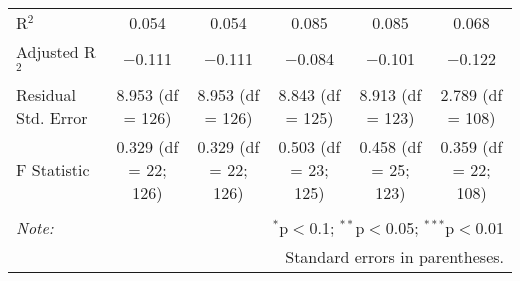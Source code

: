 \begin{tabular}{@{\extracolsep{5pt}}lccccc}
R$^{2}$ & 0.054 & 0.054 & 0.085 & 0.085 & 0.068 \\ 
Adjusted R$^{2}$ & $-$0.111 & $-$0.111 & $-$0.084 & $-$0.101 & $-$0.122 \\ 
Residual Std. Error & 8.953 (df = 126) & 8.953 (df = 126) & 8.843 (df = 125) & 8.913 (df = 123) & 2.789 (df = 108) \\ 
F Statistic & 0.329 (df = 22; 126) & 0.329 (df = 22; 126) & 0.503 (df = 23; 125) & 0.458 (df = 25; 123) & 0.359 (df = 22; 108) \\ 
\hline 
\hline \\[-1.8ex] 
\textit{Note:}  & \multicolumn{5}{r}{$^{*}$p$<$0.1; $^{**}$p$<$0.05; $^{***}$p$<$0.01} \\ 
 & \multicolumn{5}{r}{Standard errors in parentheses.} \\ 
\end{tabular} 
\endgroup 
